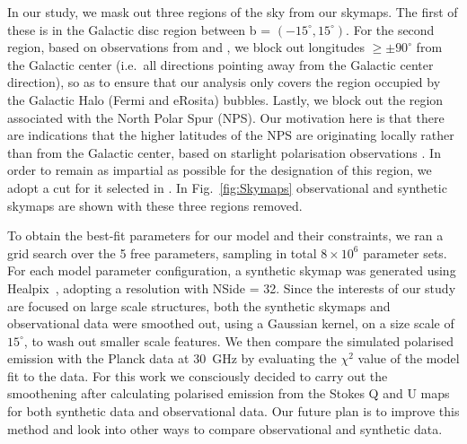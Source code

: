 \documentclass[usenatbib]{mnras}
\begin{document}
In our study, we mask out three regions of the sky from our skymaps. The first of these is in the Galactic disc region between b = $(-15^{\circ},15^{\circ})$. For the second region, based on observations from \cite{Su_2010} and \cite{eROSITA}, we block out longitudes  $\geq \pm 90^{\circ}$ from the Galactic center (i.e.~all directions pointing away from the Galactic center direction), so as to ensure that our analysis only covers the region occupied by the Galactic Halo (Fermi and eRosita) bubbles. Lastly, we block out the region associated with the North Polar Spur (NPS). Our motivation here is that there are indications that the higher latitudes of the NPS are originating locally rather than from the Galactic center, based on starlight polarisation observations \citep{Gina_2021}. In order to remain as impartial as possible for the designation of this region, we adopt a cut for it selected in \cite{Wolleben_2007}. In Fig.~\ref{fig:Skymaps} observational and synthetic skymaps are shown with these three regions removed.


To obtain the best-fit parameters for our model and their constraints, we ran a grid search over the 5 free parameters, sampling in total $8\times 10^{6}$ parameter sets. For each model parameter configuration, a synthetic skymap was generated using Healpix~\citep{Healpix_2005}, adopting a resolution with NSide = 32. Since the interests of our study are focused on large scale structures, both the synthetic skymaps and observational data were smoothed out, using a Gaussian kernel, on a size scale of $15^{\circ}$, to wash out smaller scale features. We then compare the simulated polarised emission with the Planck data at 30~GHz by evaluating the $\chi^{2}$ value of the model fit to the data.
For this work we consciously decided to carry out the smoothening after calculating polarised emission from the Stokes Q and U maps for both synthetic data and observational data. Our future plan is to improve this method and look into other ways to compare observational and synthetic data.
\end{document}
